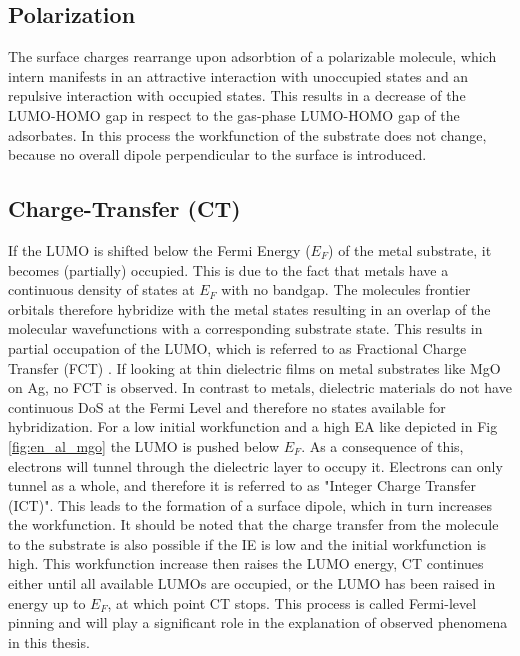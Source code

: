 \subsection{Polarization}
The surface charges rearrange upon adsorbtion of a polarizable molecule, which intern manifests in an attractive interaction with unoccupied states and an repulsive interaction with occupied states.
This results in a decrease of the LUMO-HOMO gap in respect to the gas-phase LUMO-HOMO gap of the adsorbates.
In this process the workfunction of the substrate does not change, because no overall dipole perpendicular to the surface is introduced.

\subsection{Charge-Transfer (CT)}
If the LUMO is shifted below the Fermi Energy ($E_F$) of the metal substrate, it becomes (partially) occupied.
This is due to the fact that metals have a continuous density of states at $E_F$ with no bandgap.
The molecules frontier orbitals therefore hybridize with the metal states resulting in an overlap of the molecular wavefunctions with a corresponding substrate state. 
This results in partial occupation of the LUMO, which is referred to as Fractional Charge Transfer (FCT) \cite{savu2015fingerprint}.
If looking at thin dielectric films on metal substrates like MgO on Ag, no FCT is observed.
In contrast to metals, dielectric materials do not have continuous DoS at the Fermi Level and therefore no states available for hybridization. 
For a low initial workfunction and a high EA like depicted in Fig \ref{fig:en_al_mgo} the LUMO is pushed below $E_F$.
As a consequence of this, electrons will tunnel through the dielectric layer to occupy it.
Electrons can only tunnel as a whole, and therefore it is referred to as "Integer Charge Transfer (ICT)".
This leads to the formation of a surface dipole, which in turn increases the workfunction.
It should be noted that the charge transfer from the molecule to the substrate is also possible if the IE is low and the initial workfunction is high.
This workfunction increase then raises the LUMO energy, CT continues either until all available LUMOs are occupied, or the LUMO has been raised in energy up to $E_F$, at which point CT stops.
This process is called Fermi-level pinning and will play a significant role in the explanation of observed phenomena in this thesis.








\newpage